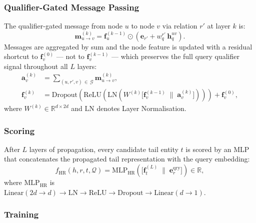 \documentclass[10pt,journal,compsoc]{IEEEtran}
\begin{document}
\subsubsection{Qualifier-Gated Message Passing}
\label{sssec:hr_mp}

The qualifier-gated message from node $u$ to node $v$
via relation $r'$ at layer $k$ is:
\begin{equation}
  \mathbf{m}_{u \to v}^{(k)}
  = \mathbf{f}_u^{(k-1)}
    \odot
    \!\left(
      \mathbf{e}_{r'} + w_q^{r'}\,\mathbf{h}_q^{uv}
    \right).
  \label{eq:hr_msg}
\end{equation}
Messages are aggregated by sum and the node feature
is updated with a residual shortcut to
$\mathbf{f}_v^{(0)}$ — not to $\mathbf{f}_v^{(k-1)}$
— which preserves the full query qualifier signal
throughout all $L$ layers:
\begin{align}
  \mathbf{a}_v^{(k)}
  &= \sum_{(u,r',v)\,\in\,\mathcal{G}}
     \mathbf{m}_{u \to v}^{(k)},
  \label{eq:hr_agg} \\[4pt]
  \mathbf{f}_v^{(k)}
  &= \mathrm{Dropout}\!\left(
       \mathrm{ReLU}\!\left(
         \mathrm{LN}\!\left(
           W^{(k)}
           \bigl[\mathbf{f}_v^{(k-1)}
           \;\|\; \mathbf{a}_v^{(k)}\bigr]
         \right)
       \right)
     \right)
     + \mathbf{f}_v^{(0)},
  \label{eq:hr_update}
\end{align}
where $W^{(k)} \in \mathbb{R}^{d \times 2d}$ and
$\mathrm{LN}$ denotes Layer Normalisation.

\subsubsection{Scoring}
\label{sssec:hr_score}

After $L$ layers of propagation, every candidate tail
entity $t$ is scored by an MLP that concatenates the
propagated tail representation with the query embedding:
\begin{equation}
  f_{\mathrm{HR}}(h,r,t,\mathcal{Q})
  = \mathrm{MLP}_{\mathrm{HR}}\!\left(
      \bigl[
        \mathbf{f}_t^{(L)}
        \;\|\;
        \mathbf{e}_r^{\mathrm{qry}}
      \bigr]
    \right) \in \mathbb{R},
  \label{eq:hr_score}
\end{equation}
where $\mathrm{MLP}_{\mathrm{HR}}$ is
$\mathrm{Linear}(2d{\to}d)
 \to \mathrm{LN}
 \to \mathrm{ReLU}
 \to \mathrm{Dropout}
 \to \mathrm{Linear}(d{\to}1)$.

\subsubsection{Training}
\label{sssec:hr_train}
\end{document}
